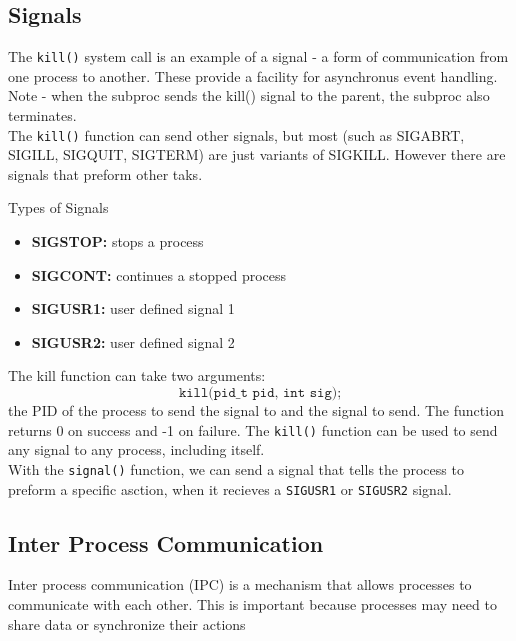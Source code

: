 \documentclass[a4paper, 10pt]{article}
\begin{document}
\subsection{Signals}
The \texttt{kill()} system call is an example of a signal - a form of communication from one process to another. These provide a facility for asynchronus event handling. Note - when the subproc sends the kill() signal to the parent, the subproc also terminates. \\[2ex]
The \texttt{kill()} function can send other signals, but most (such as SIGABRT, SIGILL, SIGQUIT, SIGTERM) are just variants of SIGKILL. However there are signals that preform other taks.
\begin{conceptbox}{Types of Signals}{}
    \begin{itemize}
        \item \textbf{SIGSTOP:} stops a process
        \item \textbf{SIGCONT:} continues a stopped process
        \item \textbf{SIGUSR1:} user defined signal 1
        \item \textbf{SIGUSR2:}  user defined signal 2
    \end{itemize}
\end{conceptbox}
The kill function can take two arguments:
$$\texttt{kill(pid\_t pid, int sig);}$$
the PID of the process to send the signal to and the signal to send. The function returns 0 on success and -1 on failure. The \texttt{kill()} function can be used to send any signal to any process, including itself. \\
With the \texttt{signal()} function, we can send a signal that tells the process to preform a specific asction, when it recieves a \texttt{SIGUSR1} or \texttt{SIGUSR2} signal.

\subsection{Inter Process Communication}
Inter process communication (IPC) is a mechanism that allows processes to communicate with each other. This is important because processes may need to share data or synchronize their actions
\end{document}
